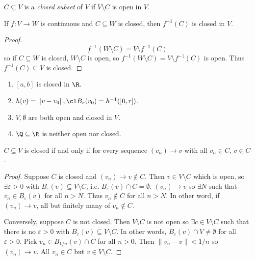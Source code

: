 \documentclass[a4paper]{article}
\theoremstyle{definition}
\begin{document}
\begin{defi}
  $C\subseteq V$ is a \emph{closed subset} of $V$ if $V\setminus C$ is open in $V$.
\end{defi}

\begin{cor}
  If $f:V\to W$ is continuous and $C\subseteq W$ is closed, then $f^{-1}(C)$ is closed in $V$.
\end{cor}

\begin{proof}
  \[
    f^{-1}(W\setminus C) = V\setminus f^{-1}(C)
  \]
  so if $C\subseteq W$ is closed, $W\setminus C$ is open, so $f^{-1}(W\setminus C) = V\setminus f^{-1}(C)$ is open. Thus $f^{-1}(C)\subseteq V$ is closed.
\end{proof}

\begin{eg}\leavevmode
  \begin{enumerate}
  \item $[a,b]$ is closed in $\R$.
  \item $h(v) = \|v-v_0\|, \cl B_r(v_0) = h^{-1}([0,r])$.
  \item $V, \emptyset$ are both open and closed in $V$.
    \item $\Q \subseteq \R$ is neither open nor closed.
  \end{enumerate}
\end{eg}

\begin{prop}
  \(C \subseteq V\) is closed if and only if for every sequence \((v_n) \to v\) with all \(v_n \in C\), \(v\in C\).
\end{prop}

\begin{proof}
  Suppose \(C\) is closed and \((v_n)\to v \notin C\). Then \(v\in V\setminus C\) which is open, so \(\exists \varepsilon>0\) with \(B_\varepsilon(v) \subseteq V\setminus C\), i.e. \(B_\varepsilon(v) \cap C =\emptyset\). \((v_n)\to v\) so \(\exists N\) such that \(v_n\in B_\varepsilon(v)\) for all \(n>N\). Thus \(v_n \notin C\) for all \(n>N\). In other word, if \((v_n)\to v\), all but finitely many of \(v_n \notin C\).

  Conversely, suppose \(C\) is not closed. Then \(V\setminus C\) is not open so \(\exists c \in V\setminus C\) such that there is no \(\varepsilon>0\) with \(B_\varepsilon(v) \subseteq V\setminus C\). In other words, \(B_\varepsilon(v) \cap V \neq \emptyset\) for all \(\varepsilon>0\). Pick \(v_n\in B_{1/n}(v)\cap C\) for all \(n>0\). Then \(\|v_n-v\|< 1/n\) so \((v_n)\to v\). All \(v_n \in C\) but \(v\in V\setminus C\).
\end{proof}
\end{document}

